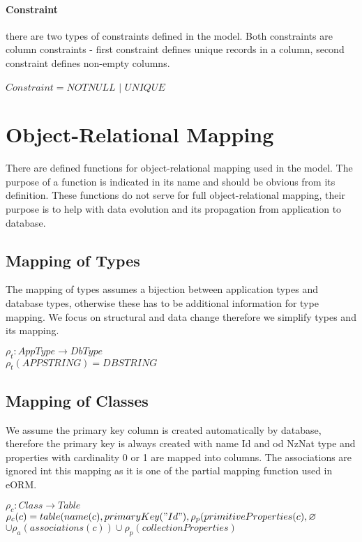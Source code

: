 \documentclass[11pt]{article}
\begin{document}
\paragraph{Constraint} there are two types of constraints defined in the model. Both constraints are column constraints - first constraint defines unique records in a column, second constraint defines non-empty columns.

\begin{center}
$Constraint = NOTNULL$ $|$ $UNIQUE $
\end{center}



\section{Object-Relational Mapping}
There are defined functions for object-relational mapping used in the model. The purpose of a function is indicated in its name and should be obvious from its definition. These functions do not serve for full object-relational mapping, their purpose is to help with data evolution and its propagation from application to database.


\subsection{Mapping of Types}
The mapping of types assumes a bijection between application types and database types, otherwise these has to be additional information for type mapping. We focus on structural and data change therefore we simplify types and its mapping.

\begin{center}
$ \rho_{t} : AppType \rightarrow DbType $ \\
$ \rho_{t}(APPSTRING) = DBSTRING $
\end{center}




\subsection{Mapping of Classes}
We assume the primary key column is created automatically by database, therefore the primary key is always created with name Id and od NzNat type and properties with cardinality 0 or 1 are mapped into columns. The associations are ignored int this mapping as it is one of the partial mapping function used in eORM.

\begin{center}
$\rho_{c}: Class \rightarrow Table $ \\ 
$\rho_{c}(c) = table(name(c), primaryKey("Id"), \rho_{p}(primitiveProperties(c), \varnothing $\\$ \cup \rho_{a}(associations(c)) \cup \rho_{p}(collectionProperties)$
\end{center}
\end{document}
